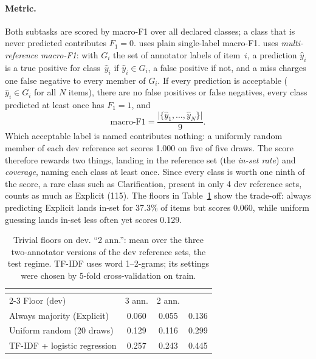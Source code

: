 \paragraph{Metric.}
Both subtasks are scored by macro-F1 over all declared classes; a class that is never predicted contributes $F_1=0$.
\Sone{} uses plain single-label macro-F1.
\Stwo{} uses \emph{multi-reference macro-F1}: with $G_i$ the set of annotator labels of item~$i$, a prediction $\hat{y}_i$ is a true positive for class~$\hat{y}_i$ if $\hat{y}_i \in G_i$, a false positive if not, and a miss charges one false negative to every member of $G_i$.
If every prediction is acceptable ($\hat{y}_i \in G_i$ for all $N$ items), there are no false positives or false negatives, every class predicted at least once has $F_1=1$, and
\begin{equation}
  \text{macro-F1} = \frac{\lvert\{\hat{y}_1,\dots,\hat{y}_N\}\rvert}{9} .
  \label{eq:task-coverage}
\end{equation}
Which acceptable label is named contributes nothing: a uniformly random member of each dev reference set scores 1.000 on five of five draws.
The score therefore rewards two things, landing in the reference set (the \emph{in-set rate}) and \emph{coverage}, naming each class at least once.
Since every class is worth one ninth of the score, a rare class such as Clarification, present in only 4 dev reference sets, counts as much as Explicit (115).
The floors in Table~\ref{tab:task-floors} show the trade-off: always predicting Explicit lands in-set for 37.3\% of items but scores 0.060, while uniform guessing lands in-set less often yet scores 0.129.

\begin{table}[t]
\centering
\small
\begin{tabular}{lccc}
\toprule
 & \multicolumn{2}{c}{\Stwo{}} & \\
\cmidrule(lr){2-3}
Floor (dev) & 3 ann. & 2 ann. & \Sone{} \\
\midrule
Always majority (Explicit) & 0.060 & 0.055 & 0.136 \\
Uniform random (20 draws) & 0.129 & 0.116 & 0.299 \\
TF-IDF + logistic regression & 0.257 & 0.243 & 0.445 \\
\bottomrule
\end{tabular}
\caption{Trivial floors on dev. ``2 ann.'': mean over the three two-annotator versions of the dev reference sets, the test regime. TF-IDF uses word 1--2-grams; its settings were chosen by 5-fold cross-validation on train.}
\label{tab:task-floors}
\end{table}


